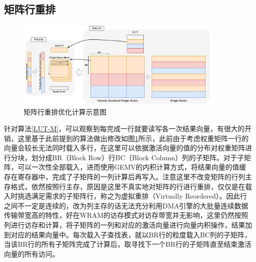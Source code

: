 \subsection{矩阵行重排}

\begin{figure}[!htbp]
	\centering
    \includegraphics[width=0.9\textwidth]{figures/LUTRow.pdf}
	\caption{矩阵行重排优化计算示意图}
    \label{LUTRow}
\end{figure}

针对算法\ref{LUT-M}，可以观察到每完成一行就要读写各一次结果向量，有很大的开销，这里基于此前提到的算法做出修改如图\ref{LUTRow}所示，此前由于考虑权重矩阵一行的向量会较长无法同时载入多行，在这里可以依据激活向量的值的分布对权重矩阵进行分块，划分成BR（Block Row）行BC（Block Column）列的子矩阵。对于子矩阵，可以一次性全部载入，进而使用GEMV的内积计算方式，将结果向量的值缓存在寄存器中，完成了子矩阵的一列计算后再写入。注意这里不改变矩阵的行列主存格式，依然按照行主存，原因是这里不真实地对矩阵的行进行重排，仅仅是在载入时挑选满足需求的子矩阵行，称之为虚拟重排（Virtually Reordered）。因此行之间不一定是连续的，改为列主存的话无法充分利用DMA引擎的大批量连续数据传输带宽高的特性，好在WRAM的访存模式对访存带宽并无影响\cite{BenchmarkingMutlu}，这里仍然按照列进行访存和计算，将子矩阵的一列和对应的激活向量进行向量内积操作，结果加到对应的结果向量中。每次载入子查找表，就以BR行的粒度载入BC列的子矩阵，当该BR行的所有子矩阵完成了计算后，取寻找下一个BR行的子矩阵直至结束激活向量的所有访问。

